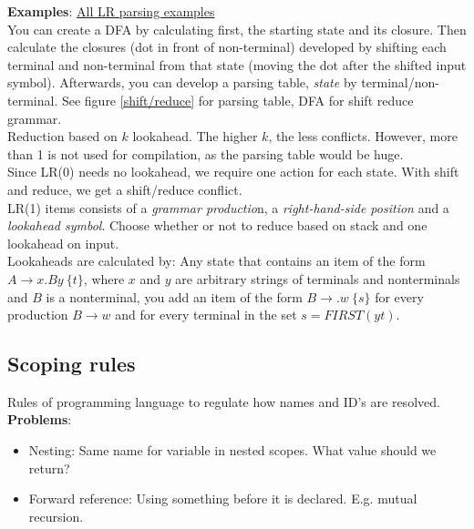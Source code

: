 \textbf{Examples}: \href{https://users-cs.au.dk/~askarov/dovs/lr/}{All LR parsing examples}\\

You can create a DFA by calculating first, the starting state and its closure. Then calculate the closures (dot in front of non-terminal) developed by shifting each terminal and non-terminal from that state (moving the dot after the shifted input symbol). Afterwards, you can develop a parsing table, \textit{state} by terminal/non-terminal. See figure \ref{shift/reduce} for parsing table, DFA for shift reduce grammar.\\

Reduction based on $k$ lookahead. The higher $k$, the less conflicts. However, more than 1 is not used for compilation, as the parsing table would be huge.\\

Since LR(0) needs no lookahead, we require one action for each state. With shift and reduce, we get a shift/reduce conflict.\\

LR(1) items consists of a \textit{grammar productio}n, a \textit{right-hand-side position} and a \textit{lookahead symbol}. Choose whether or not to reduce based on stack and one lookahead on input.\\

Lookaheads are calculated by: Any state that contains an item of the form $A \rightarrow x.By\ \{t\}$, where $x$ and $y$ are arbitrary strings of terminals and nonterminals and $B$ is a nonterminal, you add an item of the form $B \rightarrow .w\ \{s\}$ for every production $B \rightarrow w$ and for every terminal in the set $s = FIRST(yt)$.


\subsection{Scoping rules}
Rules of programming language to regulate how names and ID's are resolved.\\

\textbf{Problems}:

\begin{itemize}
    \item Nesting: Same name for variable in nested scopes. What value should we return?
    \item Forward reference: Using something before it is declared. E.g. mutual recursion.
\end{itemize}

